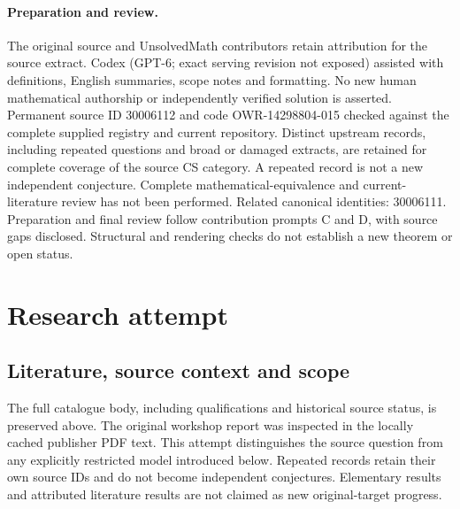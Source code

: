 \documentclass[11pt]{article}
\begin{document}
\paragraph{Preparation and review.}
The original source and UnsolvedMath contributors retain attribution for the source extract. Codex (GPT-6; exact serving revision not exposed) assisted with definitions, English summaries, scope notes and formatting. No new human mathematical authorship or independently verified solution is asserted. Permanent source ID 30006112 and code OWR-14298804-015 checked against the complete supplied registry and current repository. Distinct upstream records, including repeated questions and broad or damaged extracts, are retained for complete coverage of the source CS category. A repeated record is not a new independent conjecture. Complete mathematical-equivalence and current-literature review has not been performed. Related canonical identities: 30006111. Preparation and final review follow contribution prompts C and D, with source gaps disclosed. Structural and rendering checks do not establish a new theorem or open status.
\label{end:30006112}

\section{Research attempt}
\subsection{Literature, source context and scope}
The full catalogue body, including qualifications and historical source status, is preserved above. The original workshop report was inspected in the locally cached publisher PDF text. This attempt distinguishes the source question from any explicitly restricted model introduced below. Repeated records retain their own source IDs and do not become independent conjectures. Elementary results and attributed literature results are not claimed as new original-target progress.
\end{document}
